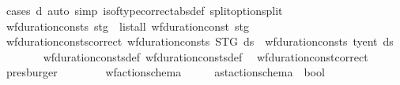 \begin{isabellebody}
%
\isatagproof
{}\isamarkupfalse%
\ {\isacharparenleft}{\kern0pt}cases\ d{\isacharparenright}{\kern0pt}\ {\isacharparenleft}{\kern0pt}auto\ simp{\isacharcolon}{\kern0pt}\ is{\isacharunderscore}{\kern0pt}of{\isacharunderscore}{\kern0pt}type{\isacharprime}{\kern0pt}{\isacharunderscore}{\kern0pt}correct{\isacharbrackleft}{\kern0pt}abs{\isacharunderscore}{\kern0pt}def{\isacharbrackright}{\kern0pt}\ split{\isacharcolon}{\kern0pt}option{\isachardot}{\kern0pt}split{\isacharparenright}{\kern0pt}%
\endisatagproof
{\isafoldproof}%
%
\isadelimproof
\isanewline
%
\endisadelimproof
\isanewline
\ \ \ \ \isamarkupfalse%
\ {\isachardoublequoteopen}wf{\isacharunderscore}{\kern0pt}duration{\isacharunderscore}{\kern0pt}consts{\isacharprime}{\kern0pt}\ stg\ {\isacharequal}{\kern0pt}\ list{\isacharunderscore}{\kern0pt}all\ {\isacharparenleft}{\kern0pt}wf{\isacharunderscore}{\kern0pt}duration{\isacharunderscore}{\kern0pt}const{\isacharprime}{\kern0pt}\ stg{\isacharparenright}{\kern0pt}{\isachardoublequoteclose}\ \isanewline
\ \ \isanewline
\ \ \ \ \isamarkupfalse%
\ wf{\isacharunderscore}{\kern0pt}duration{\isacharunderscore}{\kern0pt}consts{\isacharprime}{\kern0pt}{\isacharunderscore}{\kern0pt}correct{\isacharcolon}{\kern0pt}\ {\isachardoublequoteopen}wf{\isacharunderscore}{\kern0pt}duration{\isacharunderscore}{\kern0pt}consts{\isacharprime}{\kern0pt}\ STG\ ds\ {\isacharequal}{\kern0pt}\ wf{\isacharunderscore}{\kern0pt}duration{\isacharunderscore}{\kern0pt}consts\ ty{\isacharunderscore}{\kern0pt}ent\ ds{\isachardoublequoteclose}\isanewline
%
\isadelimproof
\ \ \ \ \ \ %
\endisadelimproof
%
\isatagproof
{}\isamarkupfalse%
\ wf{\isacharunderscore}{\kern0pt}duration{\isacharunderscore}{\kern0pt}consts{\isacharprime}{\kern0pt}{\isacharunderscore}{\kern0pt}def\ wf{\isacharunderscore}{\kern0pt}duration{\isacharunderscore}{\kern0pt}consts{\isacharunderscore}{\kern0pt}def\ \isamarkupfalse%
\ wf{\isacharunderscore}{\kern0pt}duration{\isacharunderscore}{\kern0pt}const{\isacharprime}{\kern0pt}{\isacharunderscore}{\kern0pt}correct\ \isamarkupfalse%
\ presburger%
\endisatagproof
{\isafoldproof}%
%
\isadelimproof
\isanewline
%
\endisadelimproof
\ \ \isamarkupfalse%
\ %
\isanewline
\isanewline
\ \ \isamarkupfalse%
\ wf{\isacharunderscore}{\kern0pt}action{\isacharunderscore}{\kern0pt}schema{\isacharprime}{\kern0pt}\ {\isacharcolon}{\kern0pt}{\isacharcolon}{\kern0pt}\ {\isachardoublequoteopen}{\isacharunderscore}{\kern0pt}\ {\isasymRightarrow}\ {\isacharunderscore}{\kern0pt}\ {\isasymRightarrow}\ ast{\isacharunderscore}{\kern0pt}action{\isacharunderscore}{\kern0pt}schema\ {\isasymRightarrow}\ bool{\isachardoublequoteclose}\ \isanewline

\end{isabellebody}
